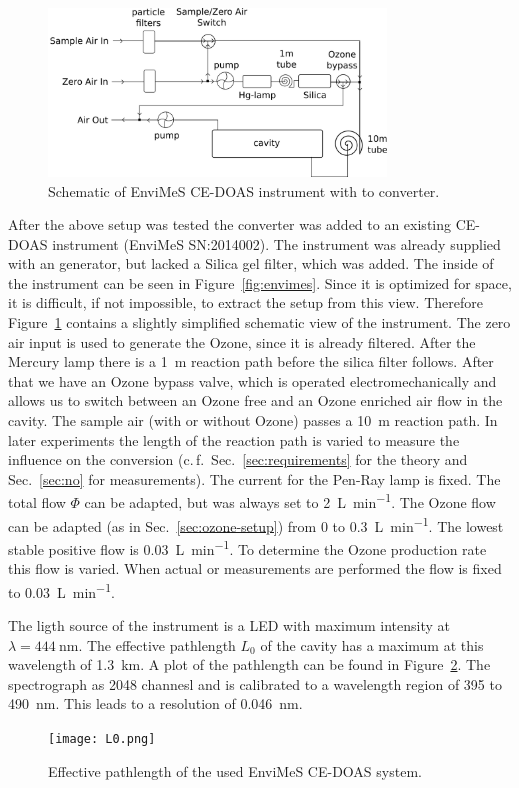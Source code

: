 \begin{figure}[htbp]
  \centering
  \includegraphics[width=0.8\textwidth]{images/envimes_setup.png}
  \caption{Schematic of EnviMeS CE-DOAS instrument with  to
     converter.}
  \label{fig:envimes-schematic}
\end{figure}

After the above setup was tested the converter was added to an
existing CE-DOAS instrument (EnviMeS SN:2014002).  The instrument was
already supplied with an  generator, but lacked a Silica gel
filter, which was added. The inside of the instrument can be seen in
Figure~\ref{fig:envimes}. Since it is optimized for space, it is
difficult, if not impossible, to extract the setup from this
view. Therefore Figure~\ref{fig:envimes-schematic} contains a slightly
simplified schematic view of the instrument. The zero air input is
used to generate the Ozone, since it is already filtered. After the
Mercury lamp there is a \SI{1}{\meter} reaction path before the silica
filter follows. After that we have an Ozone bypass valve, which is
operated electromechanically and allows us to switch between an Ozone
free and an Ozone enriched air flow in the cavity. The sample air
(with or without Ozone) passes a \SI{10}{\meter} reaction path. In
later experiments the length of the reaction path is varied to measure
the influence on the  conversion (c.\,f.\
Sec.~\ref{sec:requirements} for the theory and Sec.~\ref{sec:no} for
measurements). The current for the Pen-Ray lamp is fixed. The total
flow $\Phi$ can be adapted, but was always set to
\SI{2}{\liter\per\minute}. The Ozone flow can be adapted (as in
Sec.~\ref{sec:ozone-setup}) from 0 to \SI{0.3}{\liter\per\minute}. The
lowest stable positive flow is \SI{0.03}{\liter\per\minute}. To
determine the Ozone production rate this flow is varied. When actual
\ch{NO} or \ch{NO_x} measurements are
performed the flow is fixed to \SI{0.03}{\liter\per\minute}.

The ligth source of the instrument is a LED with maximum intensity at
$\lambda = \SI{444}{\nano\meter}$. The effective pathlength $L_0$ of
the cavity has a maximum at this wavelength of
\SI{1.3}{\kilo\meter}. A plot of the pathlength can be found in
Figure~\ref{fig:pathlength}. The spectrograph as \num{2048} channesl
and is calibrated to a wavelength region of \num{395} to
\SI{490}{\nano\meter}. This leads to a resolution of
\SI{0.046}{\nano\meter}.

\begin{figure}[htbp]
  \centering
  \texttt{[image: L0.png]}
  \caption{Effective pathlength of the used EnviMeS CE-DOAS system.}
  \label{fig:pathlength}
\end{figure}

